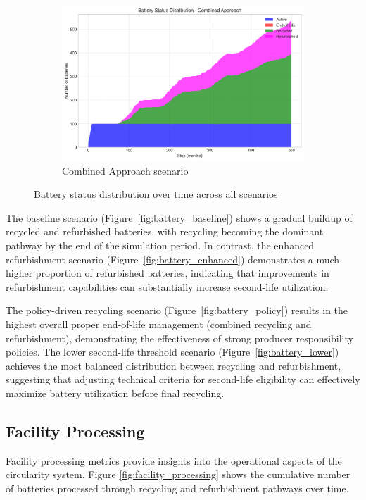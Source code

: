 \begin{figure}[htbp]
\vspace{0.2cm}
\begin{subfigure}{0.42\textwidth}
    \includegraphics[width=\textwidth]{figures/combined_approach_battery_status.png}
    \caption{Combined Approach scenario}
    \label{fig:battery_combined}
\end{subfigure}
\caption{Battery status distribution over time across all scenarios}
\label{fig:battery_status}
\end{figure}

The baseline scenario (Figure~\ref{fig:battery_baseline}) shows a gradual buildup of recycled and refurbished batteries, with recycling becoming the dominant pathway by the end of the simulation period. In contrast, the enhanced refurbishment scenario (Figure~\ref{fig:battery_enhanced}) demonstrates a much higher proportion of refurbished batteries, indicating that improvements in refurbishment capabilities can substantially increase second-life utilization.

The policy-driven recycling scenario (Figure~\ref{fig:battery_policy}) results in the highest overall proper end-of-life management (combined recycling and refurbishment), demonstrating the effectiveness of strong producer responsibility policies. The lower second-life threshold scenario (Figure~\ref{fig:battery_lower}) achieves the most balanced distribution between recycling and refurbishment, suggesting that adjusting technical criteria for second-life eligibility can effectively maximize battery utilization before final recycling.

\subsection{Facility Processing}
Facility processing metrics provide insights into the operational aspects of the circularity system. Figure \ref{fig:facility_processing} shows the cumulative number of batteries processed through recycling and refurbishment pathways over time.

